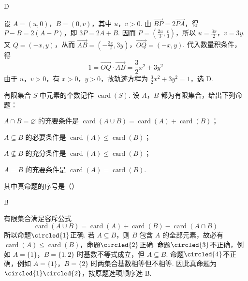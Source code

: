 \begin{answer}
D
\end{answer}

\begin{solution}
设 \(A=(u,0)\)，\(B=(0,v)\)，其中 \(u\)，\(v>0\). 由 \(\overrightarrow{BP}=2\overrightarrow{PA}\)，得 \(P-B=2(A-P)\)，即 \(3P=2A+B\). 因而 \(P=\left(\frac{2u}{3},\frac{v}{3}\right)\)，所以 \(u=\frac{3x}{2}\)，\(v=3y\). 又 \(Q=(-x,y)\)，从而
\(\overrightarrow{AB}=\left(-\frac{3x}{2},3y\right)\)，\(\overrightarrow{OQ}=(-x,y)\).
代入数量积条件，得
\[
1=\overrightarrow{OQ}\cdot\overrightarrow{AB}=\frac{3}{2}x^{2}+3y^{2}
\]
由于 \(u\)，\(v>0\)，有 \(x>0\)，\(y>0\)，故轨迹方程为 \(\frac{3}{2}x^{2}+3y^{2}=1\)，选 D.
\end{solution}

\begin{problem}
有限集合 \(S\) 中元素的个数记作 \(\operatorname{card}(S)\). 设 \(A\)，\(B\) 都为有限集合，给出下列命题：
\begin{circlelist}
\item \(A \cap B = \varnothing\) 的充要条件是 \(\operatorname{card}(A \cup B) = \operatorname{card}(A) + \operatorname{card}(B)\)；
\item \(A \subseteq B\) 的必要条件是 \(\operatorname{card}(A) \leqslant \operatorname{card}(B)\)；
\item \(A \nsubseteq B\) 的充分条件是 \(\operatorname{card}(A) \leqslant \operatorname{card}(B)\)；
\item \(A = B\) 的充要条件是 \(\operatorname{card}(A) = \operatorname{card}(B)\).
\end{circlelist}
其中真命题的序号是（\quad）

\choices
    {}
    {}
    {}
    {}
\end{problem}

\begin{answer}
B
\end{answer}

\begin{solution}
有限集合满足容斥公式
\[
\operatorname{card}(A\cup B)=\operatorname{card}(A)+\operatorname{card}(B)-\operatorname{card}(A\cap B)
\]
所以命题\(\circled{1}\)正确. 若 \(A\subseteq B\)，则 \(B\) 包含 \(A\) 的全部元素，故必有 \(\operatorname{card}(A)\leqslant\operatorname{card}(B)\)，命题\(\circled{2}\)正确. 命题\(\circled{3}\)不正确，例如 \(A=\{1\}\)，\(B=\{1,2\}\) 时基数不等式成立，但 \(A\subseteq B\). 命题\(\circled{4}\)不正确，例如 \(A=\{1\}\)，\(B=\{2\}\) 时两集合基数相等但不相等. 因此真命题为\(\circled{1}\circled{2}\)，按原题选项顺序选 B.
\end{solution}

